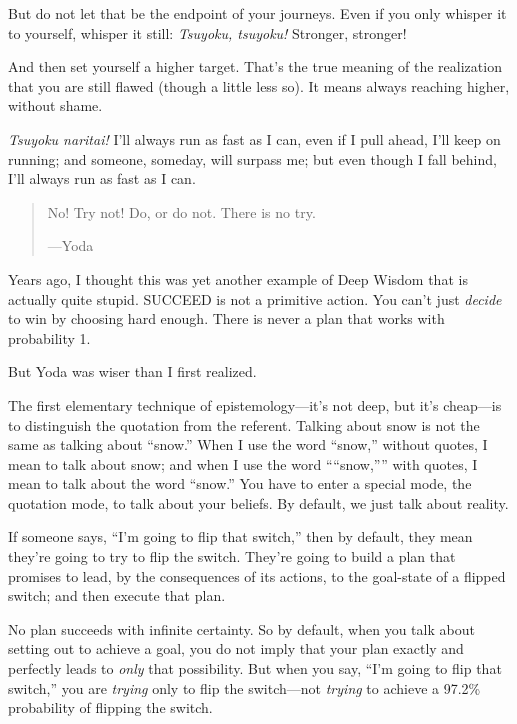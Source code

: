 {
 But do not let that be the endpoint of your journeys. Even if you
only whisper it to yourself, whisper it still: \textit{Tsuyoku,
tsuyoku!} Stronger, stronger!}

{
 And then set yourself a higher target. That's the
true meaning of the realization that you are still flawed (though a
little less so). It means always reaching higher, without shame.}

{
 \textit{Tsuyoku naritai!} I'll always run as fast
as I can, even if I pull ahead, I'll keep on running;
and someone, someday, will surpass me; but even though I fall behind,
I'll always run as fast as I can.}

\myendsectiontext


\begin{quote}
{
 No! Try not! Do, or do not. There is no try.}

{\raggedleft
 {}---Yoda
 \par}
\end{quote}


{
 Years ago, I thought this was yet another example of Deep Wisdom
that is actually quite stupid. SUCCEED is not a primitive action. You
can't just \textit{decide} to win by choosing hard
enough. There is never a plan that works with probability 1.}

{
 But Yoda was wiser than I first realized.}

{
 The first elementary technique of
epistemology---it's not deep, but it's
cheap---is to distinguish the quotation from the referent. Talking
about snow is not the same as talking about
``snow.'' When I use the word
``snow,'' without quotes, I mean to
talk about snow; and when I use the word
````snow,''''
with quotes, I mean to talk about the word
``snow.'' You have to enter a
special mode, the quotation mode, to talk about your beliefs. By
default, we just talk about reality.}

{
 If someone says, ``I'm going to
flip that switch,'' then by default, they mean
they're going to try to flip the switch.
They're going to build a plan that promises to lead, by
the consequences of its actions, to the goal-state of a flipped switch;
and then execute that plan.}

{
 No plan succeeds with infinite certainty. So by default, when you
talk about setting out to achieve a goal, you do not imply that your
plan exactly and perfectly leads to \textit{only} that possibility. But
when you say, ``I'm going to flip that
switch,'' you are \textit{trying} only to flip the
switch---not \textit{trying} to achieve a 97.2\% probability of
flipping the switch.}

